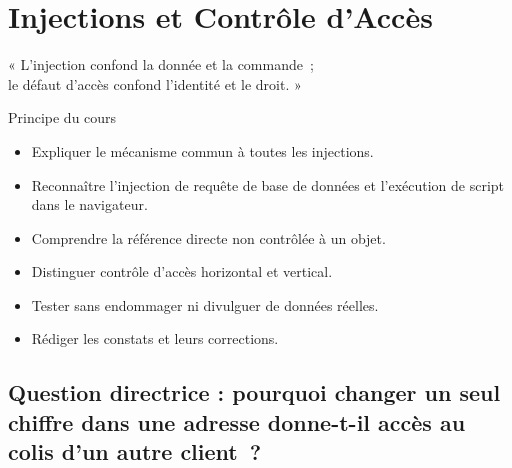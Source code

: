 
\chapter{Injections et Contrôle d'Accès}
\label{chap:injections}

\epigraph{%
    « L'injection confond la donnée et la commande~;\\
    le défaut d'accès confond l'identité et le droit. »%
}{Principe du cours}


\begin{boxobjectifs}
\begin{itemize}
    \item Expliquer le mécanisme commun à toutes les injections.
    \item Reconnaître l'injection de requête de base de données et l'exécution
          de script dans le navigateur.
    \item Comprendre la référence directe non contrôlée à un objet.
    \item Distinguer contrôle d'accès horizontal et vertical.
    \item Tester sans endommager ni divulguer de données réelles.
    \item Rédiger les constats et leurs corrections.
\end{itemize}
\end{boxobjectifs}

\bigskip

\section*{Question directrice : pourquoi changer un seul chiffre dans une adresse donne-t-il accès au colis d'un autre client~?}

